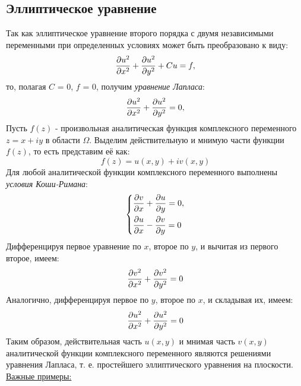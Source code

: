 \documentclass[../main.tex]{subfiles}
\begin{document}
\subsection{Эллиптическое уравнение}
Так как эллиптическое уравнение второго порядка с двумя независимыми переменными при определенных условиях может быть преобразовано к виду:
\[
    \pderivTwo{u}{x}{x} + \pderivTwo{u}{y}{y} + Cu = f,
\]
то, полагая $C$ = 0, $f$ = 0, получим \textit{уравнение Лапласа}:
\begin{equation}
        \pderivTwo{u}{x}{x} + \pderivTwo{u}{y}{y} = 0,
\end{equation}
Пусть $f(z)$ - произвольная аналитическая функция комплексного переменного $z = x + iy$ в области $\Omega$. Выделим действительную и мнимую части функции $f(z)$, то есть представим её как:
\[
    f(z) = u(x, y) + iv(x,y)
\]
Для любой аналитической функции комплексного переменного
выполнены \textit{условия Коши-Римана}:
\begin{equation}
    \begin{dcases}
        \frac{\partial v}{\partial x} + \frac{\partial u}{\partial y} = 0,\\
        \frac{\partial u}{\partial x} - \frac{\partial v}{\partial y} = 0
    \end{dcases}
\end{equation}
Дифференцируя первое уравнение по $x$, второе по $y$, и вычитая из первого второе, имеем:
\[
    \pderivTwo{v}{x}{x} + \pderivTwo{v}{y}{y} = 0
\]
Аналогично, дифференцируя первое по $y$, второе по $x$, и складывая их, имеем:
\[
    \pderivTwo{u}{x}{x} + \pderivTwo{u}{y}{y} = 0
\]
Таким образом, действительная часть $u(x, y)$ и мнимая часть $v(x, y)$ аналитической функции комплексного переменного являются решениями уравнения Лапласа, т. е. простейшего эллиптического уравнения на плоскости.\\
\underline{Важные примеры:}
\end{document}
